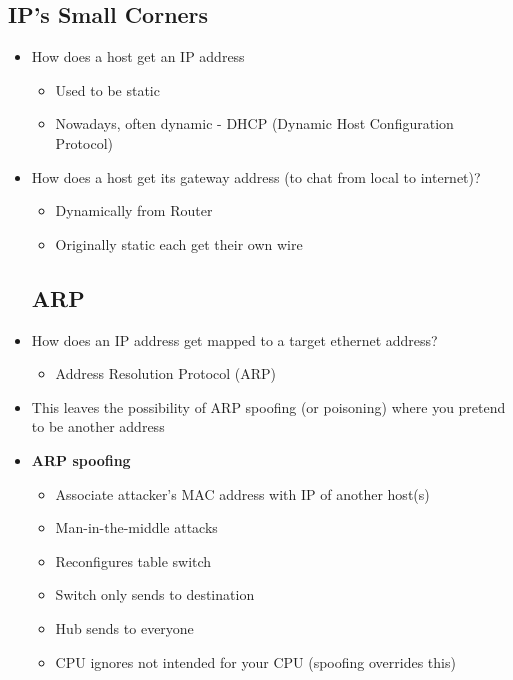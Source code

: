 \subsection{IP's Small Corners}
\begin{itemize}
	\item How does a host get an IP address
	\begin{itemize}
		\item Used to be static
		\item Nowadays, often dynamic - DHCP (Dynamic Host Configuration Protocol)
	\end{itemize}
	\item How does a host get its gateway address (to chat from local to internet)?
	\begin{itemize}
		\item Dynamically from Router 
		\item Originally static each get their own wire
	\end{itemize}
	\subsection{ARP}
	\item How does an IP address get mapped to a target ethernet address?
	\begin{itemize}
		\item Address Resolution Protocol (ARP)
	\end{itemize}
	\item This leaves the possibility of ARP spoofing (or poisoning) where you pretend to be another address
	\item \textbf{ARP spoofing}
	\begin{itemize}
		\item Associate attacker's MAC address with IP of another host(s)
		\item Man-in-the-middle attacks
		\item Reconfigures table switch
		\item Switch only sends to destination
		\item Hub sends to everyone
		\item CPU ignores not intended for your CPU (spoofing overrides this)
	\end{itemize}
\end{itemize}

